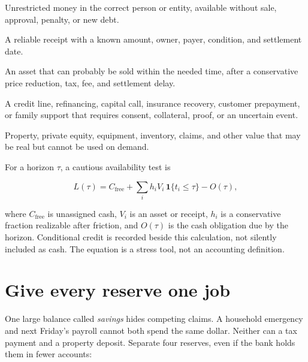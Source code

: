 \begin{description}[leftmargin=2.8em,style=nextline]
\item[Cash now] Unrestricted money in the correct person or entity, available
  without sale, approval, penalty, or new debt.
\item[Cash on date] A reliable receipt with a known amount, owner, payer,
  condition, and settlement date.
\item[Convertible asset] An asset that can probably be sold within the needed
  time, after a conservative price reduction, tax, fee, and settlement delay.
\item[Conditional access] A credit line, refinancing, capital call, insurance
  recovery, customer prepayment, or family support that requires consent,
  collateral, proof, or an uncertain event.
\item[Illiquid value] Property, private equity, equipment, inventory, claims,
  and other value that may be real but cannot be used on demand.
\end{description}

For a horizon \(\tau\), a cautious availability test is

\begin{equation}
L(\tau)=C_{\mathrm{free}}+
        \sum_i h_i V_i\,\mathbf{1}\{t_i\leq\tau\}
        -O(\tau),
\end{equation}

where \(C_{\mathrm{free}}\) is unassigned cash, \(V_i\) is an asset or receipt,
\(h_i\) is a conservative fraction realizable after friction, and \(O(\tau)\)
is the cash obligation due by the horizon. Conditional credit is recorded
beside this calculation, not silently included as cash. The equation is a
stress tool, not an accounting definition.

\section{Give every reserve one job}

One large balance called \emph{savings} hides competing claims. A household
emergency and next Friday's payroll cannot both spend the same dollar. Neither
can a tax payment and a property deposit. Separate four reserves, even if the
bank holds them in fewer accounts:

